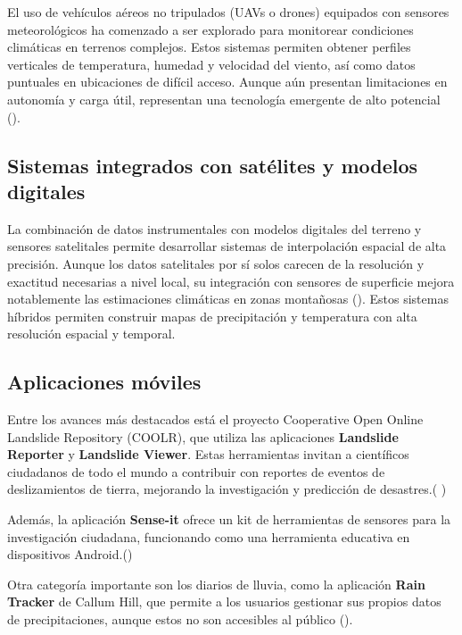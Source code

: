 El uso de vehículos aéreos no tripulados (UAVs o drones) equipados con sensores meteorológicos ha comenzado a ser explorado para monitorear condiciones climáticas en terrenos complejos. Estos sistemas permiten obtener perfiles verticales de temperatura, humedad y velocidad del viento, así como datos puntuales en ubicaciones de difícil acceso. Aunque aún presentan limitaciones en autonomía y carga útil, representan una tecnología emergente de alto potencial  (\cite{villa2016uav}).

\subsection{Sistemas integrados con satélites y modelos digitales}

La combinación de datos instrumentales con modelos digitales del terreno y sensores satelitales permite desarrollar sistemas de interpolación espacial de alta precisión. Aunque los datos satelitales por sí solos carecen de la resolución y exactitud necesarias a nivel local, su integración con sensores de superficie mejora notablemente las estimaciones climáticas en zonas montañosas  (\cite{lei2022combining}). Estos sistemas híbridos permiten construir mapas de precipitación y temperatura con alta resolución espacial y temporal.



\subsection{Aplicaciones móviles}

Entre los avances más destacados está el proyecto Cooperative Open Online Landslide Repository (COOLR), que utiliza las aplicaciones \textbf{Landslide Reporter} y \textbf{Landslide Viewer}. Estas herramientas invitan a científicos ciudadanos de todo el mundo a contribuir con reportes de eventos de deslizamientos de tierra, mejorando la investigación y predicción de desastres.(\cite{coolr2021} )

Además, la aplicación \textbf{Sense-it} ofrece un kit de herramientas de sensores para la investigación ciudadana, funcionando como una herramienta educativa en dispositivos Android.(\cite{van2017senseit})


Otra categoría importante son los diarios de lluvia, como la aplicación \textbf{Rain Tracker} de Callum Hill, que permite a los usuarios gestionar sus propios datos de precipitaciones, aunque estos no son accesibles al público  (\cite{hill2021raintracker}).


